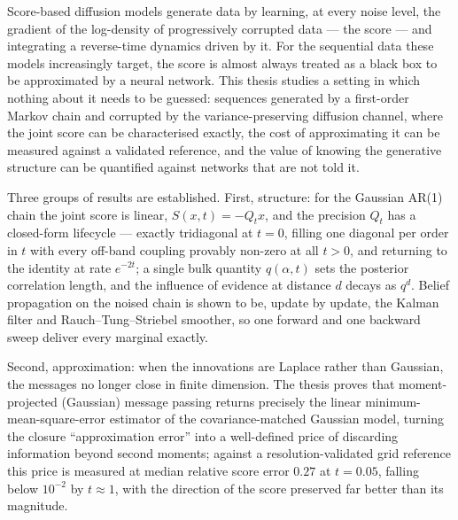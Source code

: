 
Score-based diffusion models generate data by learning, at every noise
level, the gradient of the log-density of progressively corrupted data ---
the score --- and integrating a reverse-time dynamics driven by it. For the
sequential data these models increasingly target, the score is almost
always treated as a black box to be approximated by a neural network. This
thesis studies a setting in which nothing about it needs to be guessed:
sequences generated by a first-order Markov chain and corrupted by the
variance-preserving diffusion channel, where the joint score can be
characterised exactly, the cost of approximating it can be measured against
a validated reference, and the value of knowing the generative structure
can be quantified against networks that are not told it.

Three groups of results are established. First, structure: for the Gaussian
AR(1) chain the joint score is linear, $S(x,t) = -Q_t x$, and the precision
$Q_t$ has a closed-form lifecycle --- exactly tridiagonal at $t=0$, filling
one diagonal per order in $t$ with every off-band coupling provably
non-zero at all $t>0$, and returning to the identity at rate $e^{-2t}$; a
single bulk quantity $q(\alpha,t)$ sets the posterior correlation length,
and the influence of evidence at distance $d$ decays as $q^d$. Belief
propagation on the noised chain is shown to be, update by update, the
Kalman filter and Rauch--Tung--Striebel smoother, so one forward and one
backward sweep deliver every marginal exactly.

Second, approximation: when the innovations are Laplace rather than
Gaussian, the messages no longer close in finite dimension. The thesis
proves that moment-projected (Gaussian) message passing returns precisely
the linear minimum-mean-square-error estimator of the covariance-matched
Gaussian model, turning the closure ``approximation error'' into a
well-defined price of discarding information beyond second moments;
against a resolution-validated grid reference this price is measured at
median relative score error $0.27$ at $t=0.05$, falling below $10^{-2}$ by
$t \approx 1$, with the direction of the score preserved far better than
its magnitude.

